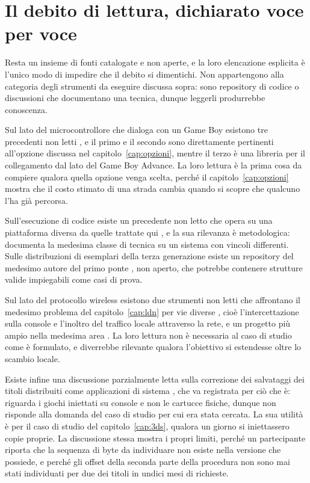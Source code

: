 \section{Il debito di lettura, dichiarato voce per voce}

Resta un insieme di fonti catalogate e non aperte, e la loro elencazione esplicita è l'unico modo di impedire che il debito si dimentichi. Non appartengono alla categoria degli strumenti da eseguire discussa sopra: sono repository di codice o discussioni che documentano una tecnica, dunque leggerli produrrebbe conoscenza.

Sul lato del microcontrollore che dialoga con un Game Boy esistono tre precedenti non letti \cite{arduino-boy,arduino-poke-gen2,gba-link-connection}, e il primo e il secondo sono direttamente pertinenti all'opzione discussa nel capitolo~\ref{cap:opzioni}, mentre il terzo è una libreria per il collegamento dal lato del Game Boy Advance. La loro lettura è la prima cosa da compiere qualora quella opzione venga scelta, perché il capitolo~\ref{cap:opzioni} mostra che il costo stimato di una strada cambia quando si scopre che qualcuno l'ha già percorsa.

Sull'esecuzione di codice esiste un precedente non letto che opera su una piattaforma diversa da quelle trattate qui \cite{stadium-ace}, e la sua rilevanza è metodologica: documenta la medesima classe di tecnica su un sistema con vincoli differenti. Sulle distribuzioni di esemplari della terza generazione esiste un repository del medesimo autore del primo ponte \cite{gen3distributions}, non aperto, che potrebbe contenere strutture valide impiegabili come casi di prova.

Sul lato del protocollo wireless esistono due strumenti non letti che affrontano il medesimo problema del capitolo~\ref{cap:ldn} per vie diverse \cite{ldn-mitm,switch-lan-play}, cioè l'intercettazione sulla console e l'inoltro del traffico locale attraverso la rete, e un progetto più ampio nella medesima area \cite{reon}. La loro lettura non è necessaria al caso di studio come è formulato, e diverrebbe rilevante qualora l'obiettivo si estendesse oltre lo scambio locale.

Esiste infine una discussione parzialmente letta sulla correzione dei salvataggi dei titoli distribuiti come applicazioni di sistema \cite{gbatemp-vc-save}, che va registrata per ciò che è: riguarda i giochi iniettati su console e non le cartucce fisiche, dunque non risponde alla domanda del caso di studio per cui era stata cercata. La sua utilità è per il caso di studio del capitolo~\ref{cap:3ds}, qualora un giorno si iniettassero copie proprie. La discussione stessa mostra i propri limiti, perché un partecipante riporta che la sequenza di byte da individuare non esiste nella versione che possiede, e perché gli offset della seconda parte della procedura non sono mai stati individuati per due dei titoli in undici mesi di richieste.

